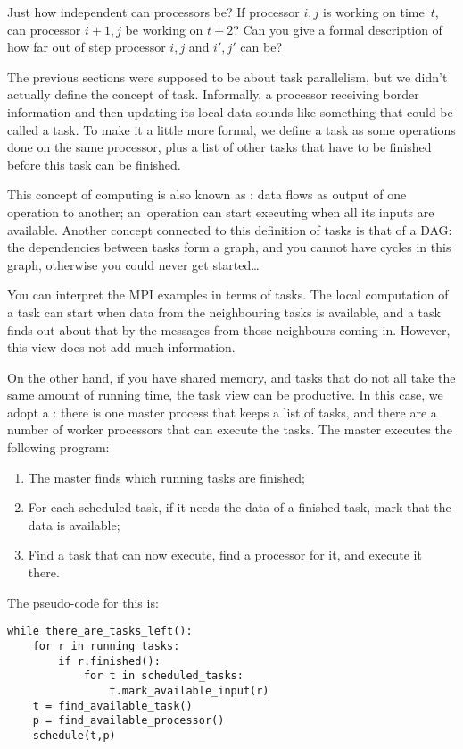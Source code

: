 \begin{exercise}
  Just how independent can processors be? If processor $i,j$ is
  working on time~$t$, can processor $i+1,j$ be working on $t+2$? Can
  you give a formal description of how far out of step processor $i,j$
  and $i',j'$ can be?
\end{exercise}

The previous sections were supposed to be about task parallelism, but
we didn't actually define the concept of task. Informally, a processor
receiving border information and then updating its local data sounds
like something that could be called a task.  To make it a little
more formal, we define a task as some operations done on the same
processor, plus a list of other tasks that have to be finished before
this task can be finished.

This concept of computing is also known as : data
flows as output of one operation to another; an~operation can start
executing when all its inputs are available. Another concept connected
to this definition of tasks is that of a \acf{DAG}: the dependencies
between tasks form a graph, and you cannot have cycles in this graph,
otherwise you could never get started\ldots

You can interpret the MPI examples in terms of tasks.
The local computation of a task can start when data from the
neighbouring tasks is available, and a task finds out about that
by the messages from those neighbours coming in. However, 
this view does not add much information.

On the other hand, if you have shared memory, and tasks that do not
all take the same amount of running time, the task view can be
productive. In this case, we adopt a :
there is one master process that keeps a list of tasks, and there are
a number of worker processors that can execute the tasks. The master executes
the following program:
\begin{enumerate}
\item The master finds which running tasks are finished;
\item For each scheduled task, if it needs the data of a finished
  task, mark that the data is available;
\item Find a task that can now execute, find a processor for it, and
  execute it there.
\end{enumerate}
The pseudo-code for this is:
\begin{verbatim}
while there_are_tasks_left():
    for r in running_tasks:
        if r.finished():
            for t in scheduled_tasks:
                t.mark_available_input(r)
    t = find_available_task()
    p = find_available_processor()
    schedule(t,p)
\end{verbatim}

